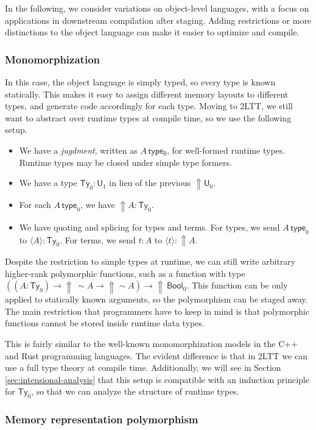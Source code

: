 \documentclass[acmsmall,anonymous,review]{acmart}
\newcommand{\msf}[1]{\mathsf{#1}}
\newcommand{\Lift}{{\Uparrow}}
\newcommand{\spl}{{\sim}}
\newcommand{\qut}[1]{\langle #1\rangle}
\renewcommand{\U}{\msf{U}}
\newcommand{\Ty}{\msf{Ty}}
\newcommand{\Bool}{\msf{Bool}}
\theoremstyle{remark}
\begin{document}
In the following, we consider variations on object-level languages, with a focus
on applications in downstream compilation after staging. Adding restrictions or
more distinctions to the object language can make it easier to optimize and
compile.

\subsubsection{Monomorphization}\label{sec:monomorphization}

In this case, the object language is simply typed, so every type is known
statically. This makes it easy to assign different memory layouts to different
types, and generate code accordingly for each type. Moving to 2LTT, we still
want to abstract over runtime types at compile time, so we use the following
setup.
\begin{itemize}
\item We have a \emph{jugdment}, written as $A\,\msf{type_0}$, for well-formed
  runtime types. Runtime types may be closed under simple type formers.
\item We have a type $\Ty_0 : \U_1$ in lieu of the previous $\Lift \U_0$.
\item For each $A\,\msf{type}_0$, we have $\Lift A : \Ty_0$.
\item We have quoting and splicing for types and terms. For types, we send $A\,
  \msf{type}_0$ to $\qut{A} : \Ty_0$. For terms, we send $t : A$ to $\qut{t} :
  \Lift A$.
\end{itemize}
Despite the restriction to simple types at runtime, we can still write arbitrary
higher-rank polymorphic functions, such as a function with type $((A : \Ty_0)
\to \Lift\,\spl A \to \Lift \spl A) \to \Lift\,\Bool_0$. This function can be
only applied to statically known arguments, so the polymorphism can be staged
away. The main restriction that programmers have to keep in mind is that
polymorphic functions cannot be stored inside runtime data types.

This is fairly similar to the well-known monomorphization models in the
C++ and Rust programming languages. The evident difference is that in 2LTT we
can use a full type theory at compile time. Additionally, we will see in Section
\ref{sec:intensional-analysis} that this setup is compatible with an induction principle for
$\Ty_0$, so that we can analyze the structure of runtime types.

\subsubsection{Memory representation polymorphism}
\end{document}
